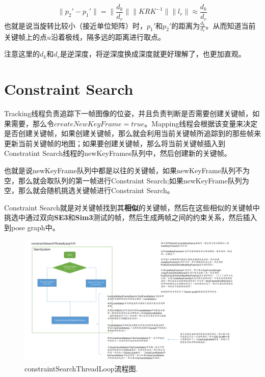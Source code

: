 \begin{equation}
	\|p_2' - p_1' \| = \| \frac{d_k}{d_r} \| \| K R K^{-1}\| \| l_r \| \approx \frac{d_k}{d_r}
\end{equation}
也就是说当旋转比较小（接近单位矩阵）时，$p_1'$和$p_2'$的距离为$\frac{d_k}{d_r}$。从而知道当前关键帧上的点$u$沿着极线，隔多远的距离进行取点。



\begin{note}
	注意这里的$d_k$和$d_r$是逆深度，将逆深度换成深度就更好理解了，也更加直观。
\end{note}








\section{Constraint Search}

Tracking线程负责追踪下一帧图像的位姿，并且负责判断是否需要创建关键帧，如果需要，那么令$createNewKeyFrame = true$。Mapping线程会根据该变量来决定是否创建关键帧，如果创建关键帧，那么就会利用当前关键帧所追踪到的那些帧来更新当前关键帧的地图；如果要创建关键帧，那么将当前关键帧插入到Constratint Search线程的newKeyFrames队列中，然后创建新的关键帧。

也就是说newKeyFrame队列中都是以往的关键帧，如果newKeyFrame队列不为空，那么就会取队列的第一帧进行Constraint Search;如果newKeyFrame队列为空，那么就会随机挑选关键帧进行Constraint Search。


Constraint Search就是对关键帧找到其\textbf{相似}的关键帧，然后在这些相似的关键帧中挑选中通过双向\textbf{SE3}和\textbf{Sim3}测试的帧，然后生成两帧之间的约束关系，然后插入到pose graph中。


\begin{figure}[h]%
	\centering  %
	\includegraphics[width=1.0\linewidth]{image/LSD-SLAM/LSD-SLAM-constraint.pdf}  %
	\caption{constraintSearchThreadLoop流程图.}  %
	\label{fig:constraint_search_thread}   %
\end{figure}



